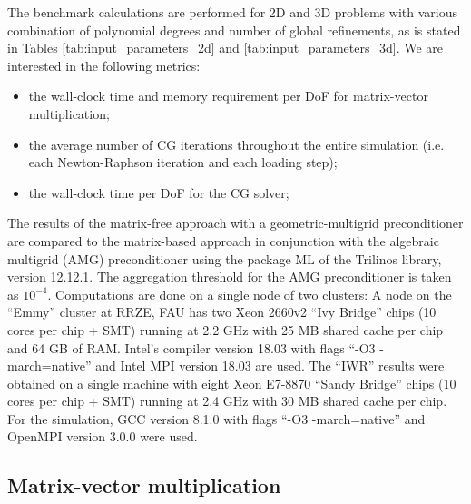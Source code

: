 \documentclass[preprint,12pt,times]{elsarticle}
\begin{document}
The benchmark calculations are performed for 2D and 3D problems with various combination of polynomial degrees and number of global refinements, as is stated in Tables \ref{tab:input_parameters_2d} and \ref{tab:input_parameters_3d}.
%
We are interested in the following metrics:
\begin{itemize}
\item the wall-clock time and memory requirement per DoF for matrix-vector multiplication;
\item the average number of CG iterations throughout the entire simulation (i.e. each Newton-Raphson iteration and each loading step);
\item the wall-clock time per DoF for the CG solver;
\end{itemize}
%
The results of the matrix-free approach with a geometric-multigrid preconditioner are compared to the matrix-based approach in conjunction with the algebraic multigrid (AMG) preconditioner using the package ML of the Trilinos \cite{Heroux2005} library, version 12.12.1.
The aggregation threshold for the AMG preconditioner is taken as $10^{-4}$.
Computations are done on a single node of two clusters:
A node on the ``Emmy'' cluster at RRZE, FAU has two Xeon 2660v2 ``Ivy Bridge'' chips (10 cores per chip + SMT) running at 2.2 GHz with 25 MB shared cache per chip and 64 GB of RAM. Intel's compiler version 18.03 with flags ``-O3 -march=native'' and Intel MPI version 18.03 are used.
The ``IWR'' results were obtained on a single machine with eight Xeon E7-8870 ``Sandy Bridge'' chips (10 cores per chip  + SMT) running at 2.4 GHz with 30 MB shared cache per chip. For the simulation, GCC version 8.1.0 with flags ``-O3 -march=native'' and OpenMPI version 3.0.0 were used.

\subsection{Matrix-vector multiplication}
\end{document}
